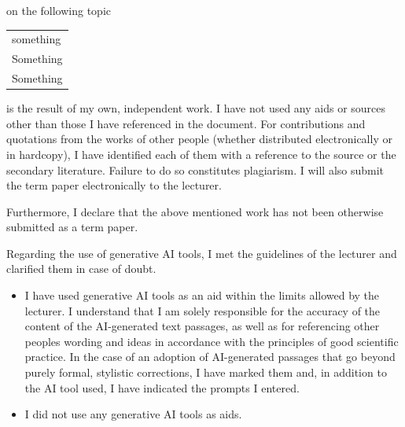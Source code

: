 \documentclass[a4paper,11pt,xcolor=dvipsnames]{article}
\begin{document}
\vspace{-0.1cm}

on the following topic

\vspace{-0.25cm}

\begin{center}
    \begin{tabularx}{0.975\textwidth}{|X|}
    \hline
    \cellcolor{black!15}something\\
    \cellcolor{black!15}Something\\
    \cellcolor{black!15}Something\\
    \hline
\end{tabularx}
\end{center}


\vspace{0.3cm}


is the result of my own, independent work. I have not used any aids or sources other than those I have referenced in the document. For contributions and quotations from the works of other people (whether distributed electronically or in hardcopy), I have identified each of them with a reference to the source or the secondary literature. Failure to do so constitutes plagiarism. I will also submit the term paper electronically to the lecturer.\\

\vspace{\baselineskip}

Furthermore, I declare that the above mentioned work has not been
otherwise submitted as a term paper.\\

\vspace{\baselineskip}

Regarding the use of generative AI tools, I met the guidelines of the
lecturer and clarified them in case of doubt.


\def\LayoutCheckField#1#2{%
  #2 #1%
}

\begin{itemize}
    \item[\mbox{\begin{Form}\CheckBox[height=0.2cm, width=0.2cm]{}\end{Form}}] I have used generative AI tools as an aid within the limits allowed by the lecturer. I understand that I am solely responsible for the accuracy of the content of the AI-generated text passages, as well as for referencing other people\textquotesingle s wording and ideas in accordance with the principles of good scientific practice. In the case of an adoption of AI-generated passages that go beyond purely formal, stylistic corrections, I have marked them and, in addition to the AI tool used, I have indicated the prompts I entered.
    
        
    \item[\mbox{\begin{Form}\CheckBox[height=0.2cm, width=0.2cm]{}\end{Form}}]I did not use any generative AI tools as aids.
\end{itemize}
\end{document}
